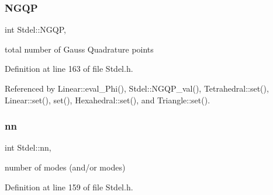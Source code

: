 \mbox{\label{classStdel_aa3cff31280606cd3eb95af770dd6f5b4}} 
\subsubsection{\texorpdfstring{N\+G\+QP}{NGQP}}
{\footnotesize\ttfamily int Stdel\+::\+N\+G\+QP\hspace{0.3cm}{\ttfamily [protected]}, {\ttfamily [inherited]}}



total number of Gauss Quadrature points 



Definition at line 163 of file Stdel.\+h.



Referenced by Linear\+::eval\+\_\+\+Phi(), Stdel\+::\+N\+G\+Q\+P\+\_\+val(), Tetrahedral\+::set(), Linear\+::set(), set(), Hexahedral\+::set(), and Triangle\+::set().

\mbox{\label{classStdel_af4d02765d362e2f0469633ff78734f89}} 
\subsubsection{\texorpdfstring{nn}{nn}}
{\footnotesize\ttfamily int Stdel\+::nn\hspace{0.3cm}{\ttfamily [protected]}, {\ttfamily [inherited]}}



number of modes (and/or modes) 



Definition at line 159 of file Stdel.\+h.



